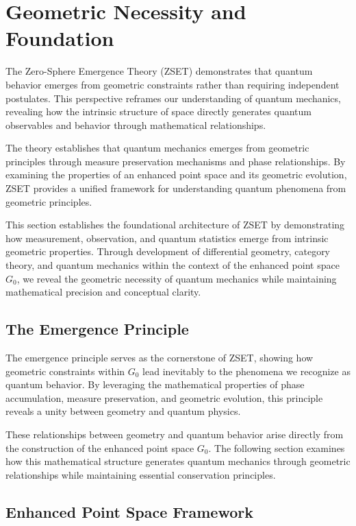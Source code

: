\documentclass[10pt]{article}
\begin{document}
\section{Geometric Necessity and Foundation}

The Zero-Sphere Emergence Theory (ZSET) demonstrates that quantum behavior emerges from geometric constraints rather than requiring independent postulates. This perspective reframes our understanding of quantum mechanics, revealing how the intrinsic structure of space directly generates quantum observables and behavior through mathematical relationships.

The theory establishes that quantum mechanics emerges from geometric principles through measure preservation mechanisms and phase relationships. By examining the properties of an enhanced point space and its geometric evolution, ZSET provides a unified framework for understanding quantum phenomena from geometric principles.

This section establishes the foundational architecture of ZSET by demonstrating how measurement, observation, and quantum statistics emerge from intrinsic geometric properties. Through development of differential geometry, category theory, and quantum mechanics within the context of the enhanced point space $G_0$, we reveal the geometric necessity of quantum mechanics while maintaining mathematical precision and conceptual clarity.

\subsection{The Emergence Principle}

The emergence principle serves as the cornerstone of ZSET, showing how geometric constraints within $G_0$ lead inevitably to the phenomena we recognize as quantum behavior. By leveraging the mathematical properties of phase accumulation, measure preservation, and geometric evolution, this principle reveals a unity between geometry and quantum physics.

These relationships between geometry and quantum behavior arise directly from the construction of the enhanced point space $G_0$. The following section examines how this mathematical structure generates quantum mechanics through geometric relationships while maintaining essential conservation principles.

\subsection{Enhanced Point Space Framework}
\end{document}
